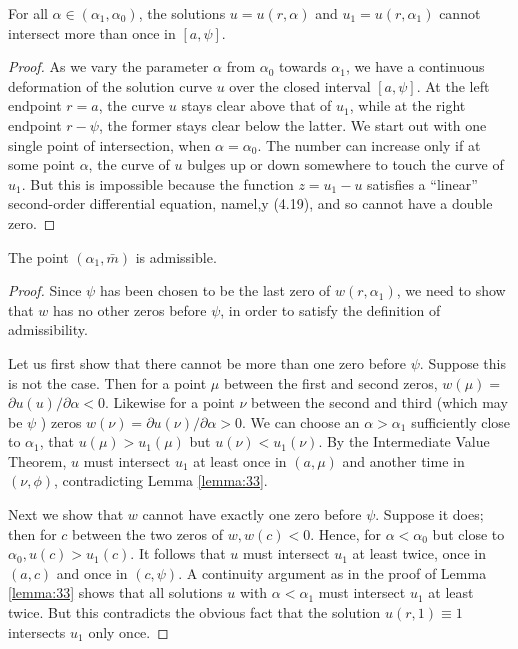 \begin{lemma}\label{lemma:33}
  For all $\alpha \in\left(\alpha_1, \alpha_0\right)$, the solutions $u=u(r, \alpha)$ and
  $u_1=u\left(r, \alpha_1\right)$ cannot intersect more than once in $[a, \psi]$.
\end{lemma}

\begin{proof}
  As we vary the parameter $\alpha$ from $\alpha_0$ towards $\alpha_1$,
  we have a continuous deformation of the solution curve $u$
  over the closed interval $[a, \psi]$. At the left endpoint $r=a$,
  the curve $u$ stays clear above that of $u_1$, while at the right endpoint $r-\psi$,
  the former stays clear below the latter. We start out with one single point of intersection, 
  when $\alpha=\alpha_0$. The number can increase only if at some point $\alpha$,
  the curve of $u$ bulges up or down somewhere to touch the curve of $u_1$.
  But this is impossible because the function $z=u_1-u$ satisfies a ``linear'' second-order 
  differential equation, namel,y (4.19), and so cannot have a double zero.
\end{proof}

\begin{lemma}\label{lemma:34}
  The point $\left(\alpha_1, \bar{m}\right)$ is admissible.
\end{lemma}

\begin{proof}
  Since $\psi$ has been chosen to be the last zero of $w\left(r, \alpha_1\right)$,
  we need to show that $w$ has no other zeros before $\psi$, in order to
  satisfy the definition of admissibility.
  
  Let us first show that there cannot be more than one zero before $\psi$.
  Suppose this is not the case. Then for a point $\mu$ between the first and second zeros,
  $w(\mu)=$ $\partial u(u) / \partial \alpha<0$. Likewise for a point $\nu$
  between the second and third (which may be $\psi$ )
  zeros $w(\nu)=\partial u(\nu) / \partial \alpha>0$. We can choose an $\alpha>\alpha_1$ 
  sufficiently close to
  $\alpha_1$, that $u(\mu)>u_1(\mu)$ but $u(\nu)<u_1(\nu)$. By the Intermediate Value Theorem, 
  $u$ must intersect $u_1$ at least once in $(a, \mu)$ and another time in $(\nu, \phi)$, 
  contradicting Lemma \ref{lemma:33}.

  Next we show that $w$ cannot have exactly one zero before $\psi$. Suppose it does;
  then for $c$ between the two zeros of $w, w(c)<0$. 
  Hence, for $\alpha<\alpha_0$ but close to $\alpha_0, u(c)>u_1(c)$.
  It follows that $u$ must intersect $u_1$ at least twice,
  once in $(a, c)$ and once in $(c, \psi)$. A continuity argument as
  in the proof of Lemma \ref{lemma:33}
  shows that all solutions $u$ with $\alpha<\alpha_1$ must intersect $u_1$ at least twice. But 
  this contradicts the obvious fact that the solution $u(r, 1) \equiv 1$ intersects $u_1$ only 
  once.
\end{proof}


